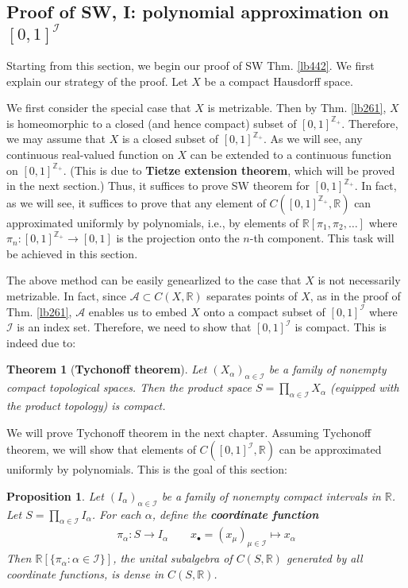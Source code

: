 \documentclass[12pt,b5paper,notitlepage]{article}
\theoremstyle{definition}
\theoremstyle{plain}
\newtheorem{thm}[df]{Theorem}
\newtheorem{pp}[df]{Proposition}
\newcommand{\scr}{\mathscr}
\newcommand{\blt}{\bullet}
\newcommand{\Zbb}{\mathbb Z}
\newcommand{\Rbb}{\mathbb R}
\numberwithin{equation}{section}
\begin{document}
\subsection{Proof of SW, I: polynomial approximation on $[0,1]^{\scr I}$}



Starting from this section, we begin our proof of SW Thm. \ref{lb442}. We first explain our strategy of the proof. Let $X$ be a compact Hausdorff space. 

We first consider the special case that $X$ is metrizable. Then by Thm. \ref{lb261}, $X$ is homeomorphic to a closed (and hence compact) subset of $[0,1]^{\Zbb_+}$. Therefore, we may assume that $X$ is a closed subset of $[0,1]^{\Zbb_+}$. As we will see, any continuous real-valued function on $X$ can be extended to a continuous function on  $[0,1]^{\Zbb_+}$. (This is due to \textbf{Tietze extension theorem}, which will be proved in the next section.) Thus, it suffices to prove SW theorem for $[0,1]^{\Zbb_+}$. In fact, as we will see, it suffices to prove that any element of $C([0,1]^{\Zbb_+},\Rbb)$ can approximated uniformly by polynomials, i.e., by elements of $\Rbb[\pi_1,\pi_2,\dots]$ where $\pi_n:[0,1]^{\Zbb_+}\rightarrow[0,1]$ is the projection onto the $n$-th component. This task will be achieved in this section.

The above method can be easily genearlized to the case that $X$ is not necessarily metrizable. In fact, since $\scr A\subset C(X,\Rbb)$ separates points of $X$, as in the proof of  Thm. \ref{lb261}, $\scr A$ enables us to embed $X$ onto a compact subset of $[0,1]^{\scr I}$ where $\scr I$ is an index set. Therefore, we need to show that $[0,1]^{\scr I}$ is compact. This is indeed due to:


\begin{thm}[\textbf{Tychonoff theorem}]\label{lb452}
Let $(X_\alpha)_{\alpha\in\scr I}$ be a family of nonempty compact topological spaces. Then the product space $S=\prod_{\alpha\in\scr I}X_\alpha$ (equipped with the product topology) is compact.
\end{thm}
We will prove Tychonoff theorem in the next chapter. Assuming Tychonoff theorem, we will show that elements of $C([0,1]^{\scr I},\Rbb)$ can be approximated uniformly by polynomials. This is the goal of this section:


\begin{pp}\label{lb451}
Let $(I_\alpha)_{\alpha\in\scr I}$ be a family of nonempty compact  intervals in $\Rbb$. Let $S=\prod_{\alpha\in\scr I}I_\alpha$. For each $\alpha$, define the \textbf{coordinate function}
\begin{align*}
\pi_\alpha:S\rightarrow I_\alpha\qquad x_\blt=(x_\mu)_{\mu\in\scr I}\mapsto x_\alpha
\end{align*}
Then $\Rbb[\{\pi_\alpha:\alpha\in\scr I\}]$, the unital subalgebra of $C(S,\Rbb)$ generated by all coordinate functions, is dense in $C(S,\Rbb)$.
\end{pp}
\end{document}
